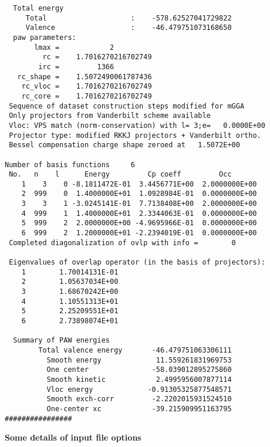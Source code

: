 \documentclass[11pt]{article}
\begin{document}
\begin{verbatim}
  Total energy
     Total                    :    -578.62527041729822     
     Valence                  :    -46.479751073168650     
  paw parameters: 
       lmax =            2
         rc =    1.7016270216702749     
        irc =         1366
   rc_shape =    1.5072490061787436     
    rc_vloc =    1.7016270216702749     
    rc_core =    1.7016270216702749     
 Sequence of dataset construction steps modified for mGGA
 Only projectors from Vanderbilt scheme available
 Vloc: VPS match (norm-conservation) with l= 3;e=   0.0000E+00
 Projector type: modified RKKJ projectors + Vanderbilt ortho.
 Bessel compensation charge shape zeroed at   1.5072E+00

Number of basis functions     6
 No.   n    l      Energy         Cp coeff         Occ
    1    3    0 -8.1811472E-01  3.4456771E+00  2.0000000E+00
    2  999    0  1.4000000E+01  1.0928984E-01  0.0000000E+00
    3    3    1 -3.0245141E-01  7.7138408E+00  2.0000000E+00
    4  999    1  1.4000000E+01  2.3344063E-01  0.0000000E+00
    5  999    2  2.0000000E+00 -4.9695966E-01  0.0000000E+00
    6  999    2  1.2000000E+01 -2.2394019E-01  0.0000000E+00
 Completed diagonalization of ovlp with info =        0
  
 Eigenvalues of overlap operator (in the basis of projectors):
    1        1.70014131E-01
    2        1.05637034E+00
    3        1.68670242E+00
    4        1.10551313E+01
    5        2.25209551E+01
    6        2.73898074E+01
  
  Summary of PAW energies
        Total valence energy       -46.479751063306111     
          Smooth energy             11.559261831969753     
          One center               -58.039012895275860     
          Smooth kinetic            2.4995956007877114     
          Vloc energy             -0.91305325877548571     
          Smooth exch-corr         -2.2202015931524510     
          One-center xc            -39.215909951163795     
################
\end{verbatim}


\begin{center}
	{\bf{Some details of input file options}}


\end{center}	
\end{document}
